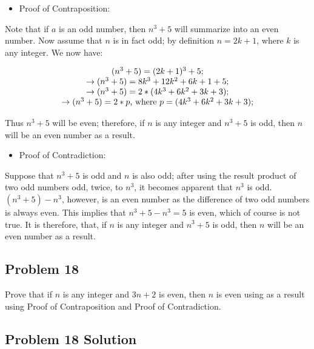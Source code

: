 \documentclass[11pt]{article}
\begin{document}
\begin{itemize}
	\item Proof of Contraposition:
\end{itemize}

Note that if $a$ is an odd number, then $n^3 + 5$ will summarize into an even number. Now assume that $n$ is in fact odd; by definition $n =
2k + 1$, where $k$ is any integer. We now have:

\begin{displaymath}
\begin{tabular}{c}
$(n^3 + 5) = (2k + 1)^3 + 5;$ \\
$\to (n^3 + 5) = 8k^3  + 12k^2 + 6k + 1 + 5;$ \\
$\to (n^3 + 5) = 2 * (4k^3  + 6k^2 + 3k + 3);$ \\
$\to (n^3 + 5) = 2 * p$, where $p = (4k^3  + 6k^2 + 3k + 3);$ \\
\end{tabular}
\end{displaymath}

Thus $n^3 + 5$ will be even; therefore, if $n$ is any integer and $n^3 + 5$ is odd, then $n$ will be an even number as a result.

\begin{itemize}
	\item Proof of Contradiction:
\end{itemize}

Suppose that $n^3 + 5$ is odd and $n$ is also odd; after using the result product of two odd numbers odd, twice, to $n^3$, it becomes apparent that $n^3$ is odd. $(n^3 + 5) - n^3$, however, is an even number as the difference of two odd numbers is always even. This implies that $n^3 + 5 - n^3 = 5$ is even, which of course is not true. It is therefore, that, if $n$ is any integer and $n^3 + 5$ is odd, then $n$ will be an even number as a result.

\subsection{Problem 18}

Prove that if $n$ is any integer and $3n + 2$ is even, then $n$ is even using as a result using Proof of Contraposition and Proof of Contradiction.

\subsection{Problem 18 Solution}
\end{document}

